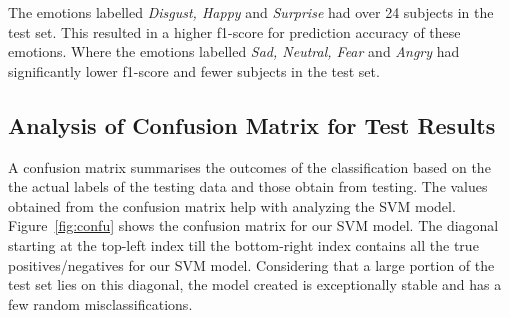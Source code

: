 The emotions labelled \textit{Disgust, Happy} and \textit{Surprise} had over 24 subjects in the test set. This resulted in a higher f1-score for prediction accuracy of these emotions. Where the emotions labelled \textit{Sad, Neutral, Fear} and \textit{Angry} had significantly lower f1-score and fewer subjects in the test set. 
\begin{table}[H]
\centering
{}
\caption{SVM Classification Report}
\label{table:class}
\end{table}


\subsection{Analysis of Confusion Matrix for Test Results}


A confusion matrix summarises the outcomes of the classification based on the the actual labels of the testing data and those obtain from testing. The values obtained from the confusion matrix help with analyzing the SVM model. Figure~\ref{fig:confu} shows the confusion matrix for our SVM model. The diagonal starting at the top-left index till the bottom-right index contains all the true positives/negatives for our SVM model. Considering that a large portion of the test set lies on this diagonal, the model created is exceptionally stable and has a few random misclassifications. 

